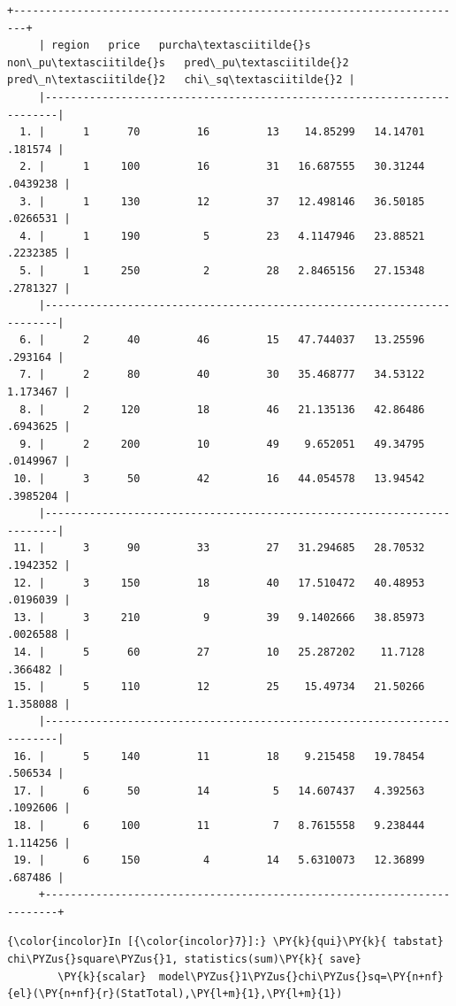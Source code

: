\documentclass[11pt,notitlepage]{article}\usepackage[]{graphicx}\usepackage[]{color}
\makeatletter
\newenvironment{kframe}{%
 \def\at@end@of@kframe{}%
 \ifinner\ifhmode%
  \def\at@end@of@kframe{\end{minipage}}%
  \begin{minipage}{\columnwidth}%
 \fi\fi%
 \def\FrameCommand##1{\hskip\@totalleftmargin \hskip-\fboxsep
 \colorbox{shadecolor}{##1}\hskip-\fboxsep
     \hskip-\linewidth \hskip-\@totalleftmargin \hskip\columnwidth}%
 \MakeFramed {\advance\hsize-\width
   \@totalleftmargin\z@ \linewidth\hsize
   \@setminipage}}%
 {\par\unskip\endMakeFramed%
 \at@end@of@kframe}
\newenvironment{knitrout}{}{} %
\makeatother
\begin{document}
\begin{enumerate}[a)]
\begin{knitrout}
\begin{kframe}
\begin{footnotesize}
\begin{Verbatim}[commandchars=\\\{\}]
     +------------------------------------------------------------------------+
     | region   price   purcha\textasciitilde{}s   non\_pu\textasciitilde{}s   pred\_pu\textasciitilde{}2   pred\_n\textasciitilde{}2   chi\_sq\textasciitilde{}2 |
     |------------------------------------------------------------------------|
  1. |      1      70         16         13    14.85299   14.14701    .181574 |
  2. |      1     100         16         31   16.687555   30.31244   .0439238 |
  3. |      1     130         12         37   12.498146   36.50185   .0266531 |
  4. |      1     190          5         23   4.1147946   23.88521   .2232385 |
  5. |      1     250          2         28   2.8465156   27.15348   .2781327 |
     |------------------------------------------------------------------------|
  6. |      2      40         46         15   47.744037   13.25596    .293164 |
  7. |      2      80         40         30   35.468777   34.53122   1.173467 |
  8. |      2     120         18         46   21.135136   42.86486   .6943625 |
  9. |      2     200         10         49    9.652051   49.34795   .0149967 |
 10. |      3      50         42         16   44.054578   13.94542   .3985204 |
     |------------------------------------------------------------------------|
 11. |      3      90         33         27   31.294685   28.70532   .1942352 |
 12. |      3     150         18         40   17.510472   40.48953   .0196039 |
 13. |      3     210          9         39   9.1402666   38.85973   .0026588 |
 14. |      5      60         27         10   25.287202    11.7128    .366482 |
 15. |      5     110         12         25    15.49734   21.50266   1.358088 |
     |------------------------------------------------------------------------|
 16. |      5     140         11         18    9.215458   19.78454    .506534 |
 17. |      6      50         14          5   14.607437   4.392563   .1092606 |
 18. |      6     100         11          7   8.7615558   9.238444   1.114256 |
 19. |      6     150          4         14   5.6310073   12.36899    .687486 |
     +------------------------------------------------------------------------+

    \end{Verbatim}
\end{footnotesize}
    \begin{Verbatim}[commandchars=\\\{\}]
{\color{incolor}In [{\color{incolor}7}]:} \PY{k}{qui}\PY{k}{ tabstat} chi\PYZus{}square\PYZus{}1, statistics(sum)\PY{k}{ save}
        \PY{k}{scalar}  model\PYZus{}1\PYZus{}chi\PYZus{}sq=\PY{n+nf}{el}(\PY{n+nf}{r}(StatTotal),\PY{l+m}{1},\PY{l+m}{1})
\end{Verbatim}


\end{kframe}
\end{knitrout}
\end{enumerate}
\end{document}
